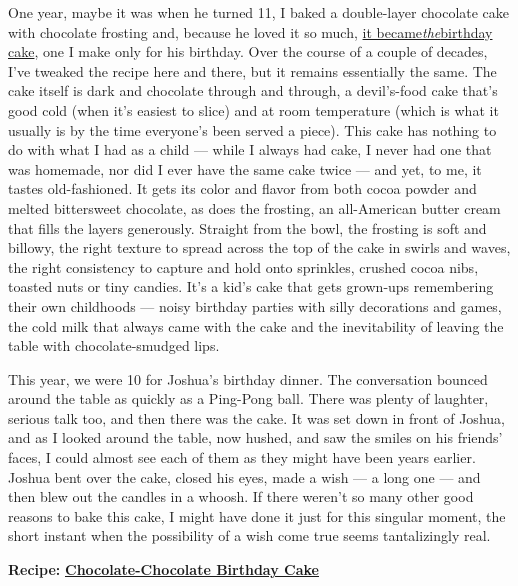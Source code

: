 One year, maybe it was when he turned 11, I baked a double-layer
chocolate cake with chocolate frosting and, because he loved it so much,
\href{https://cooking.nytimes3xbfgragh.onion/recipes/1019312-chocolate-chocolate-birthday-cake}{it
became}\emph{\href{https://cooking.nytimes3xbfgragh.onion/recipes/1019312-chocolate-chocolate-birthday-cake}{the}}\href{https://cooking.nytimes3xbfgragh.onion/recipes/1019312-chocolate-chocolate-birthday-cake}{birthday
cake}, one I make only for his birthday. Over the course of a couple of
decades, I've tweaked the recipe here and there, but it remains
essentially the same. The cake itself is dark and chocolate through and
through, a devil's-food cake that's good cold (when it's easiest to
slice) and at room temperature (which is what it usually is by the time
everyone's been served a piece). This cake has nothing to do with what I
had as a child --- while I always had cake, I never had one that was
homemade, nor did I ever have the same cake twice --- and yet, to me, it
tastes old-fashioned. It gets its color and flavor from both cocoa
powder and melted bittersweet chocolate, as does the frosting, an
all-American butter cream that fills the layers generously. Straight
from the bowl, the frosting is soft and billowy, the right texture to
spread across the top of the cake in swirls and waves, the right
consistency to capture and hold onto sprinkles, crushed cocoa nibs,
toasted nuts or tiny candies. It's a kid's cake that gets grown-ups
remembering their own childhoods --- noisy birthday parties with silly
decorations and games, the cold milk that always came with the cake and
the inevitability of leaving the table with chocolate-smudged lips.

This year, we were 10 for Joshua's birthday dinner. The conversation
bounced around the table as quickly as a Ping-Pong ball. There was
plenty of laughter, serious talk too, and then there was the cake. It
was set down in front of Joshua, and as I looked around the table, now
hushed, and saw the smiles on his friends' faces, I could almost see
each of them as they might have been years earlier. Joshua bent over the
cake, closed his eyes, made a wish --- a long one --- and then blew out
the candles in a whoosh. If there weren't so many other good reasons to
bake this cake, I might have done it just for this singular moment, the
short instant when the possibility of a wish come true seems
tantalizingly real.

\textbf{Recipe:}
\href{https://cooking.nytimes3xbfgragh.onion/recipes/1019312-chocolate-chocolate-birthday-cake}{\textbf{Chocolate-Chocolate
Birthday Cake}}

